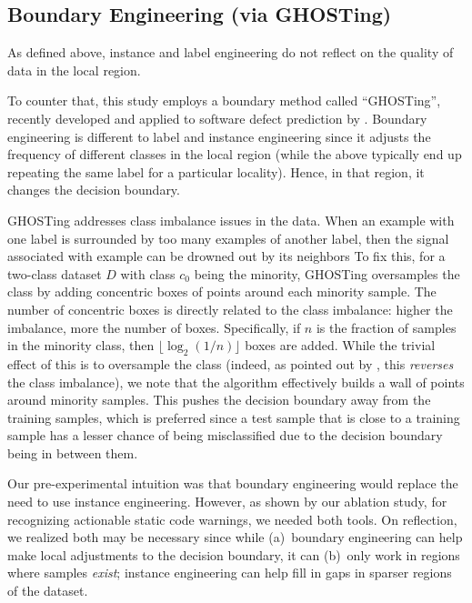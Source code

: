 \subsection{Boundary Engineering (via GHOSTing)}

As defined above, instance and label engineering do not reflect on the quality of data in the local region.

To counter that, this study employs a boundary method called ``GHOSTing'', recently developed and applied to software defect prediction  by    \citet{yedida2021value}.
 Boundary engineering is different to label and instance engineering since it adjusts the frequency of different classes
 in the local region (while the above typically end up repeating the same label for a particular locality). Hence, in that region,
 it changes the decision boundary. 
 
 
GHOSTing addresses class imbalance issues in the data.   When an example with one label
is surrounded by too many examples of another label, then the signal associated with
example can be drowned out by its neighbors
To fix this,
for a two-class dataset $D$ with class $c_0$ being the minority, GHOSTing oversamples the class by adding concentric boxes of points around each minority sample. The number of concentric boxes is directly related to the class imbalance: higher the imbalance, more the number of boxes. Specifically, if $n$ is the fraction of samples in the minority class, then $\lfloor \log_2 (1/n) \rfloor$ boxes are added.
While the trivial effect of this is to oversample the class (indeed, as pointed out by \citet{yedida2021value}, this \textit{reverses} the class imbalance), we note that the algorithm effectively builds a wall of points around minority samples.
This pushes the decision boundary away from the training samples, which is preferred since a test sample that is close to a training sample has a lesser chance of   being
misclassified due to the decision boundary being in between
them.

Our pre-experimental intuition was that  boundary engineering would replace the need to use instance engineering. However, as shown by our ablation study, for recognizing actionable static code warnings, we needed both tools. On reflection, we realized   both may be  necessary since while (a)~boundary engineering can help make local adjustments to the decision boundary, it can (b)~only work in regions where samples \textit{exist}; instance engineering can help fill in gaps in sparser regions of the dataset.


